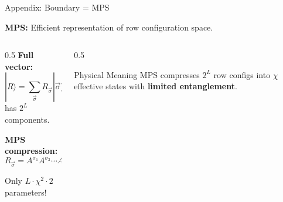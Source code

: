 \documentclass[aspectratio=169, 11pt]{beamer}
\begin{document}
\begin{frame}{Appendix: Boundary = MPS}
    
    \textbf{MPS:} Efficient representation of row configuration space.
    
    \vspace{0.3cm}
    
    \begin{columns}
        \begin{column}{0.5\textwidth}
            \textbf{Full vector:}
            \[
            |R\rangle = \sum_{\vec{\sigma}} R_{\vec{\sigma}} |\vec{\sigma}\rangle
            \]
            has $2^L$ components.
            
            \vspace{0.3cm}
            
            \textbf{MPS compression:}
            \[
            R_{\vec{\sigma}} = A^{\sigma_1} A^{\sigma_2} \cdots A^{\sigma_L}
            \]
            
            Only $L \cdot \chi^2 \cdot 2$ parameters!
        \end{column}
        
        \begin{column}{0.5\textwidth}
            \begin{center}
            \end{center}
            
            \begin{block}{Physical Meaning}
                MPS compresses $2^L$ row configs into $\chi$ effective states with \textbf{limited entanglement}.
            \end{block}
        \end{column}
    \end{columns}
\end{frame}
\end{document}
